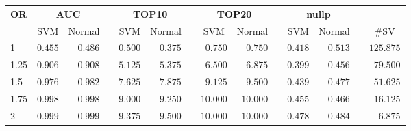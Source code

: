 \documentclass{article}\usepackage[]{graphicx}\usepackage[]{color}
\begin{document}
%
\begin{table}[!tbp]
\begin{center}
\begin{tabular}{lrrcrrcrrcrrcr}
\hline\hline
\multicolumn{1}{l}{\bfseries OR}&\multicolumn{2}{c}{\bfseries AUC}&\multicolumn{1}{c}{\bfseries }&\multicolumn{2}{c}{\bfseries TOP10}&\multicolumn{1}{c}{\bfseries }&\multicolumn{2}{c}{\bfseries TOP20}&\multicolumn{1}{c}{\bfseries }&\multicolumn{2}{c}{\bfseries nullp}&\multicolumn{1}{c}{\bfseries }&\multicolumn{1}{c}{\bfseries }\tabularnewline
\cline{2-3} \cline{5-6} \cline{8-9} \cline{11-12}
\multicolumn{1}{l}{}&\multicolumn{1}{c}{SVM}&\multicolumn{1}{c}{Normal}&\multicolumn{1}{c}{}&\multicolumn{1}{c}{SVM}&\multicolumn{1}{c}{Normal}&\multicolumn{1}{c}{}&\multicolumn{1}{c}{SVM}&\multicolumn{1}{c}{Normal}&\multicolumn{1}{c}{}&\multicolumn{1}{c}{SVM}&\multicolumn{1}{c}{Normal}&\multicolumn{1}{c}{}&\multicolumn{1}{c}{\#SV}\tabularnewline
\hline
1&$0.455$&$0.486$&&$0.500$&$0.375$&&$ 0.750$&$ 0.750$&&$0.418$&$0.513$&&$125.875$\tabularnewline
1.25&$0.906$&$0.908$&&$5.125$&$5.375$&&$ 6.500$&$ 6.875$&&$0.399$&$0.456$&&$ 79.500$\tabularnewline
1.5&$0.976$&$0.982$&&$7.625$&$7.875$&&$ 9.125$&$ 9.500$&&$0.439$&$0.477$&&$ 51.625$\tabularnewline
1.75&$0.998$&$0.998$&&$9.000$&$9.250$&&$10.000$&$10.000$&&$0.455$&$0.466$&&$ 16.125$\tabularnewline
2&$0.999$&$0.999$&&$9.375$&$9.500$&&$10.000$&$10.000$&&$0.478$&$0.484$&&$  6.875$\tabularnewline
\hline
\end{tabular}
\end{center}
\end{table}
\end{document}
